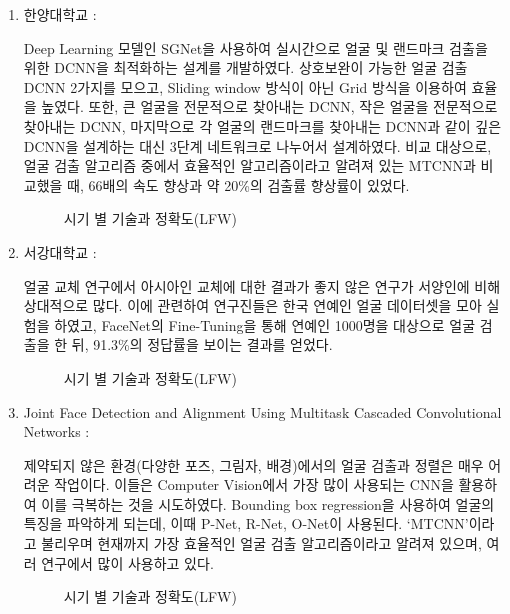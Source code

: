 \documentclass{oblivoir}
\begin{document}
\begin{enumerate}%
    \item 한양대학교 :

    Deep Learning 모델인 SGNet을 사용하여 실시간으로 얼굴 및 랜드마크 검출을 위한 DCNN을 최적화하는 설계를 개발하였다. 
    상호보완이 가능한 얼굴 검출 DCNN 2가지를 모으고, Sliding window 방식이 아닌 Grid 방식을 이용하여 효율을 높였다. 
    또한, 큰 얼굴을 전문적으로 찾아내는 DCNN, 작은 얼굴을 전문적으로 찾아내는 DCNN, 마지막으로 각 얼굴의 랜드마크를 찾아내는 DCNN과
    같이 깊은 DCNN을 설계하는 대신 3단계 네트워크로 나누어서 설계하였다. 비교 대상으로, 
    얼굴 검출 알고리즘 중에서 효율적인 알고리즘이라고 알려져 있는 MTCNN과 비교했을 때, 66배의 속도 향상과 약 20\%의 검출률 향상률이 있었다.

    \begin{figure}[h!]
        \centering
        \caption{시기 별 기술과 정확도(LFW) \cite{reference6}}
    \end{figure}

    \item 서강대학교 : 

    얼굴 교체 연구에서 아시아인 교체에 대한 결과가 좋지 않은 연구가 서양인에 비해 상대적으로 많다.
    이에 관련하여 연구진들은 한국 연예인 얼굴 데이터셋을 모아 실험을 하였고, 
    FaceNet의 Fine-Tuning을 통해 연예인 1000명을 대상으로 얼굴 검출을 한 뒤, 
    91.3\%의 정답률을 보이는 결과를 얻었다.

    \begin{figure}[h!]
        \centering
        \caption{시기 별 기술과 정확도(LFW) \cite{reference6}}
    \end{figure}

    \item Joint Face Detection and Alignment Using Multitask Cascaded Convolutional Networks : 

    제약되지 않은 환경(다양한 포즈, 그림자, 배경)에서의 얼굴 검출과 정렬은 매우 어려운 작업이다. 
    이들은 Computer Vision에서 가장 많이 사용되는 CNN을 활용하여 이를 극복하는 것을 시도하였다.
    Bounding box regression을 사용하여 얼굴의 특징을 파악하게 되는데, 이때 P-Net, R-Net, O-Net이 사용된다.
    ‘MTCNN’이라고 불리우며 현재까지 가장 효율적인 얼굴 검출 알고리즘이라고 알려져 있으며, 여러 연구에서 많이 사용하고 있다. 

    \begin{figure}[h!]
        \centering
        \caption{ 시기 별 기술과 정확도(LFW)\cite{reference6}}
    \end{figure}


\end{enumerate}
\end{document}
